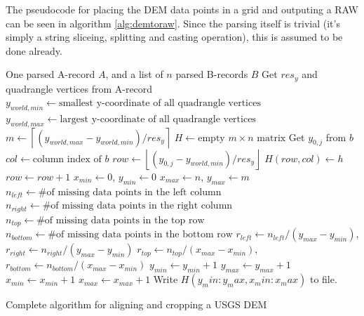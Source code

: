 The pseudocode for placing the DEM data points in a grid and outputing a RAW can be seen in algorithm \ref{alg:demtoraw}. Since the parsing itself is trivial (it's simply a string sliceing, splitting and casting operation), this is assumed to be done already.

\begin{algorithm}[ht]
\begin{algorithmic}
\REQUIRE One parsed A-record $A$, and a list of $n$ parsed B-records $B$
\STATE Get $res_y$ and quadrangle vertices from A-record
\STATE $y_{world,min}\gets \mbox{smallest y-coordinate of all quadrangle vertices}$
\STATE $y_{world,max}\gets \mbox{largest y-coordinate of all quadrangle vertices}$
\STATE $m \gets \left\lceil(y_{world,max}-y_{world,min})/res_y\right\rceil$
\STATE $H\gets \mbox{empty $m\times n$ matrix}$
    \STATE Get $y_{0,j}$ from $b$
    \STATE $col \gets \mbox{column index of $b$}$
    \STATE $row \gets \left\lfloor (y_{0,j}-y_{world,min})/res_y\right\rfloor$
        \STATE $H(row,col) \gets h$
        \STATE $row \gets row+1$
    \ENDFOR
\ENDFOR
\STATE $x_{min}\gets 0$, $y_{min}\gets 0$
\STATE $x_{max}\gets n$, $y_{max}\gets m$
    \STATE $n_{left}\gets \mbox{\# of missing data points in the left column}$
    \STATE $n_{right}\gets \mbox{\# of missing data points in the right column}$
    \STATE $n_{top}\gets \mbox{\# of missing data points in the top row}$
    \STATE $n_{bottom}\gets \mbox{\# of missing data points in the bottom row}$
    \STATE $r_{left}\gets n_{left}/(y_{max}-y_{min})$, $r_{right}\gets n_{right}/(y_{max}-y_{min})$
    \STATE $r_{top}\gets n_{top}/(x_{max}-x_{min})$, $r_{bottom}\gets n_{bottom}/(x_{max}-x_{min})$
        \STATE $y_{min} \gets y_{min}+1$
        \STATE $y_{max} \gets y_{max}+1$
        \STATE $x_{min} \gets x_{min}+1$
        \STATE $x_{max} \gets x_{max}+1$
    \ENDIF
\ENDWHILE
\STATE Write $H(y_min:y_max, x_min:x_max)$ to file.
\end{algorithmic}
\caption{Complete algorithm for aligning and cropping a USGS DEM}
\label{alg:demtoraw}
\end{algorithm}

